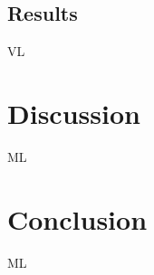 \documentclass[journal]{IEEEtran}
\begin{document}
\subsection{Results}

VL

\section{Discussion}

ML

\section{Conclusion}

ML




% 










\end{document}
